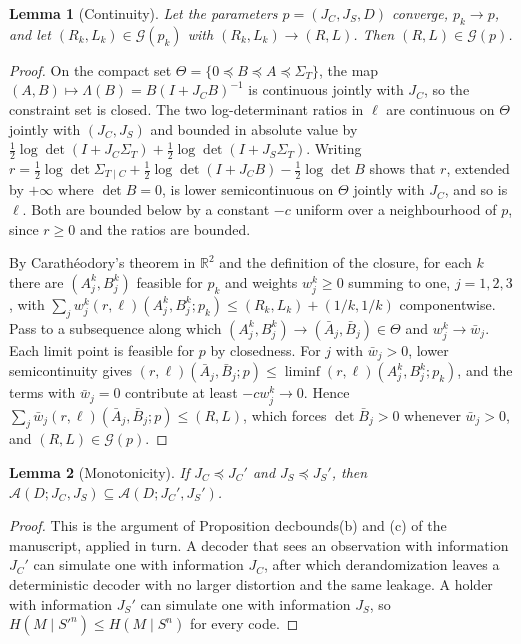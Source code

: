 \documentclass[11pt]{article}
\newtheorem{lemma}{Lemma}
\theoremstyle{remark}
\begin{document}
\begin{lemma}[Continuity]\label{lem:cont}
Let the parameters $p=(J_C,J_S,D)$ converge, $p_k\to p$, and let $(R_k,L_k)\in\mathcal G(p_k)$ with $(R_k,L_k)\to(R,L)$. Then $(R,L)\in\mathcal G(p)$.
\end{lemma}

\begin{proof}
On the compact set $\Theta=\{0\preceq B\preceq A\preceq\Sigma_T\}$, the map $(A,B)\mapsto\Lambda(B)=B(I+J_CB)^{-1}$ is continuous jointly with $J_C$, so the constraint set is closed. The two log-determinant ratios in $\ell$ are continuous on $\Theta$ jointly with $(J_C,J_S)$ and bounded in absolute value by $\tfrac12\log\det(I+J_C\Sigma_T)+\tfrac12\log\det(I+J_S\Sigma_T)$. Writing $r=\tfrac12\log\det\Sigma_{T\mid C}+\tfrac12\log\det(I+J_CB)-\tfrac12\log\det B$ shows that $r$, extended by $+\infty$ where $\det B=0$, is lower semicontinuous on $\Theta$ jointly with $J_C$, and so is $\ell$. Both are bounded below by a constant $-c$ uniform over a neighbourhood of $p$, since $r\ge0$ and the ratios are bounded.

By Carath\'eodory's theorem in $\mathbb R^2$ and the definition of the closure, for each $k$ there are $(A_j^k,B_j^k)$ feasible for $p_k$ and weights $w_j^k\ge0$ summing to one, $j=1,2,3$, with $\sum_jw_j^k(r,\ell)(A_j^k,B_j^k;p_k)\le(R_k,L_k)+(1/k,1/k)$ componentwise. Pass to a subsequence along which $(A_j^k,B_j^k)\to(\bar A_j,\bar B_j)\in\Theta$ and $w_j^k\to\bar w_j$. Each limit point is feasible for $p$ by closedness. For $j$ with $\bar w_j>0$, lower semicontinuity gives $(r,\ell)(\bar A_j,\bar B_j;p)\le\liminf(r,\ell)(A_j^k,B_j^k;p_k)$, and the terms with $\bar w_j=0$ contribute at least $-cw_j^k\to0$. Hence $\sum_j\bar w_j(r,\ell)(\bar A_j,\bar B_j;p)\le(R,L)$, which forces $\det\bar B_j>0$ whenever $\bar w_j>0$, and $(R,L)\in\mathcal G(p)$.
\end{proof}

\begin{lemma}[Monotonicity]\label{lem:mono}
If $J_C\preceq J_C'$ and $J_S\preceq J_S'$, then $\mathcal A(D;J_C,J_S)\subseteq\mathcal A(D;J_C',J_S')$.
\end{lemma}

\begin{proof}
This is the argument of Proposition decbounds(b) and (c) of the manuscript, applied in turn. A decoder that sees an observation with information $J_C'$ can simulate one with information $J_C$, after which derandomization leaves a deterministic decoder with no larger distortion and the same leakage. A holder with information $J_S'$ can simulate one with information $J_S$, so $H(M\mid S'^n)\le H(M\mid S^n)$ for every code.
\end{proof}
\end{document}
